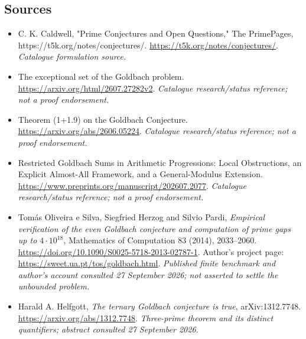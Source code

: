\documentclass[11pt,a4paper]{article}
\numberwithin{equation}{section}
\begin{document}

\subsection{Sources}
\begin{itemize}\raggedright
\item[\textnormal{[S1]}]\hypertarget{source:25:1}{} C. K. Caldwell, "Prime Conjectures and Open Questions," The PrimePages, https://t5k.org/notes/conjectures/.
\url{https://t5k.org/notes/conjectures/}.
{\small\textit{Catalogue formulation source.}}
\item[\textnormal{[S2]}]\hypertarget{source:25:2}{} The exceptional set of the Goldbach problem.
\url{https://arxiv.org/html/2607.27282v2}.
{\small\textit{Catalogue research/status reference; not a proof endorsement.}}
\item[\textnormal{[S3]}]\hypertarget{source:25:3}{} Theorem (1+1.9) on the Goldbach Conjecture.
\url{https://arxiv.org/abs/2606.05224}.
{\small\textit{Catalogue research/status reference; not a proof endorsement.}}
\item[\textnormal{[S4]}]\hypertarget{source:25:4}{} Restricted Goldbach Sums in Arithmetic Progressions: Local Obstructions, an Explicit Almost-All Framework, and a General-Modulus Extension.
\url{https://www.preprints.org/manuscript/202607.2077}.
{\small\textit{Catalogue research/status reference; not a proof endorsement.}}
\item[\textnormal{[E1]}]\hypertarget{extra:25:1}{} Tom\'as Oliveira e Silva,
Siegfried Herzog and Silvio Pardi, \emph{Empirical verification of the even
Goldbach conjecture and computation of prime gaps up to $4\cdot10^{18}$},
Mathematics of Computation 83 (2014), 2033--2060.
\url{https://doi.org/10.1090/S0025-5718-2013-02787-1}.
Author's project page: \url{https://sweet.ua.pt/tos/goldbach.html}.
{\small\textit{Published finite benchmark and author's account consulted
27 September 2026; not asserted to settle the unbounded problem.}}
\item[\textnormal{[E2]}]\hypertarget{extra:25:2}{} Harald A. Helfgott,
\emph{The ternary Goldbach conjecture is true}, arXiv:1312.7748.
\url{https://arxiv.org/abs/1312.7748}.
{\small\textit{Three-prime theorem and its distinct quantifiers;
abstract consulted 27 September 2026.}}

\end{itemize}

\end{document}

